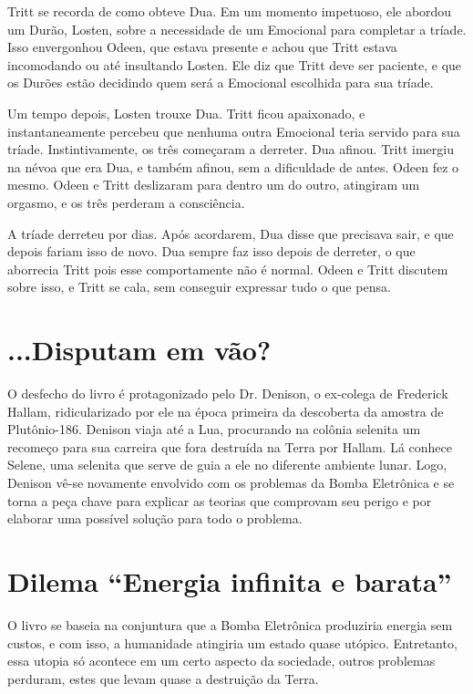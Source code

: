 \documentclass[14pt,portuguese]{extreport}
\begin{document}
	Tritt se recorda de como obteve Dua. Em um momento impetuoso, ele abordou um Durão, Losten, sobre a necessidade de um Emocional para completar a tríade. Isso envergonhou Odeen, que estava presente e 
	achou que Tritt estava incomodando ou até insultando Losten. Ele diz que Tritt deve ser paciente, e que os Durões estão decidindo quem será a Emocional escolhida para sua tríade.
	
	Um tempo depois, Losten trouxe Dua. Tritt ficou apaixonado, e instantaneamente percebeu que nenhuma outra Emocional teria servido para sua tríade. Instintivamente, os três começaram a derreter.
	Dua afinou. Tritt imergiu na névoa que era Dua, e também afinou, sem a dificuldade de antes. Odeen fez o mesmo. Odeen e Tritt deslizaram para dentro um do outro, atingiram um orgasmo, e os três perderam
	a consciência.
	
	A tríade derreteu por dias. Após acordarem, Dua disse que precisava sair, e que depois fariam isso de novo. Dua sempre faz isso depois de derreter, o que aborrecia Tritt pois esse comportamente não é
	normal. Odeen e Tritt discutem sobre isso, e Tritt se cala, sem conseguir expressar tudo o que pensa.
    
    \section{...Disputam em vão?}
    
      O desfecho do livro é protagonizado pelo Dr. Denison, o ex-colega de
      Frederick Hallam, ridicularizado por ele na época primeira da descoberta
      da amostra de Plutônio-186. Denison viaja até a Lua, procurando na
      colônia selenita um recomeço para sua carreira que fora destruída na
      Terra por Hallam. Lá conhece Selene, uma selenita que serve de guia a
      ele no diferente ambiente lunar. Logo, Denison vê-se novamente
      envolvido com os problemas da Bomba Eletrônica e se torna a peça
      chave para explicar as teorias que comprovam seu perigo e por elaborar
      uma possível solução para todo o problema.
        
    \section{Dilema “Energia infinita e barata”}

      O livro se baseia na conjuntura que a Bomba Eletrônica produziria energia sem custos, e com isso, a humanidade atingiria um estado quase utópico. 
      Entretanto, essa utopia só acontece em um certo aspecto da sociedade, outros problemas perduram, estes que levam quase a destruição da Terra.
\end{document}

